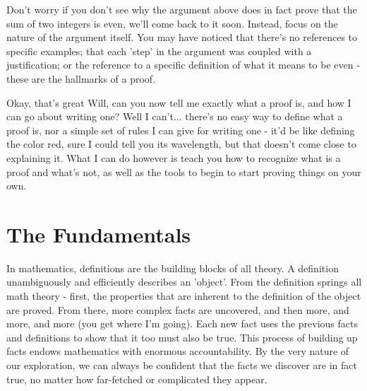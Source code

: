\documentclass[a4paper,12pt]{article}
\begin{document}
Don't worry if you don't see why the argument above does in fact prove that the sum of two integers is even, we'll come back to it soon. Instead, focus on the nature of the argument itself. You may have noticed that there's no references to specific examples; that each 'step' in the argument was coupled with a justification; or the reference to a specific definition of what it means to be even - these are the hallmarks of a proof. 

Okay, that's great Will, can you now tell me exactly what a proof is, and how I can go about writing one? Well I can't... there's no easy way to define what a proof is, nor a simple set of rules I can give for writing one - it'd be like defining the color red, sure I could tell you its wavelength, but that doesn't come close to explaining it. What I can do however is teach you how to recognize what is a proof and what's not, as well as the tools to begin to start proving things on your own.

\section{The Fundamentals}
In mathematics, definitions are the building blocks of all theory. A definition unambiguously and efficiently describes an 'object'. From the definition springs all math theory - first, the properties that are inherent to the definition of the object are proved. From there, more complex facts are uncovered, and then more, and more, and more (you get where I'm going). Each new fact uses the previous facts and definitions to show that it too must also be true. This process of building up facts endows mathematics with enormous accountability. By the very nature of our exploration, we can always be confident that the facts we discover are in fact true, no matter how far-fetched or complicated they appear. 

  
\end{document}
